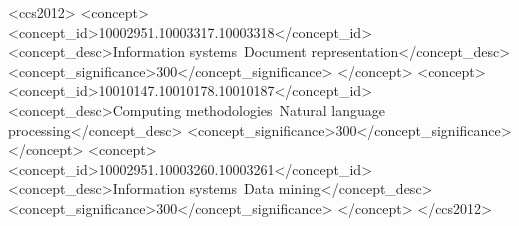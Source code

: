 \documentclass[sigconf,authordraft,anonymous]{acmart}
\begin{document}
\begin{CCSXML}
<ccs2012>
 <concept>
  <concept_id>10002951.10003317.10003318</concept_id>
  <concept_desc>Information systems~Document representation</concept_desc>
  <concept_significance>300</concept_significance>
 </concept>
 <concept>
  <concept_id>10010147.10010178.10010187</concept_id>
  <concept_desc>Computing methodologies~Natural language processing</concept_desc>
  <concept_significance>300</concept_significance>
 </concept>
 <concept>
  <concept_id>10002951.10003260.10003261</concept_id>
  <concept_desc>Information systems~Data mining</concept_desc>
  <concept_significance>300</concept_significance>
 </concept>
</ccs2012>
\end{CCSXML}



\maketitle

\end{document}
